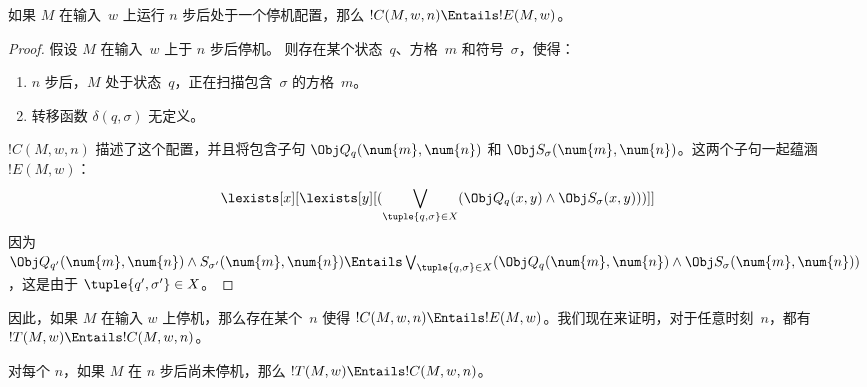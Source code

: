 \documentclass[../../../include/open-logic-section]{subfiles}
\begin{document}
\begin{lem}
如果 $M$ 在输入~$w$ 上运行 $n$ 步后处于一个停机配置，那么 $!C(M, w, n) \Entails !E(M, w)$。
\end{lem}

\begin{proof}
假设 $M$ 在输入~$w$ 上于 $n$ 步后停机。
则存在某个状态~$q$、方格~$m$ 和符号~$\sigma$，使得：
\begin{enumerate}
\item $n$ 步后，$M$ 处于状态~$q$，正在扫描包含~$\sigma$ 的方格~$m$。
\item 转移函数 $\delta(q, \sigma)$ 无定义。
\end{enumerate}
$!C(M, w, n)$ 描述了这个配置，并且将包含子句 $\Obj Q_{q}(\num{m}, \num{n})$ 和 $\Obj
S_{\sigma}(\num{m}, \num{n})$。这两个子句一起蕴涵 $!E(M, w)$：
\[
\lexists[x][\lexists[y][(\bigvee_{\tuple{q, \sigma} \in
      X}(\Obj Q_q(x, y) \land \Obj S_\sigma(x, y)))]]
\]
因为 $\Obj Q_{q'}(\num{m}, \num{n}) \land S_{\sigma'}(\num{m}, \num{n}) \Entails \bigvee_{\tuple{q, \sigma} \in X} (\Obj Q_q(\num{m}, \num{n}) \land \Obj S_{\sigma}(\num{m}, \num{n}))$，这是由于 $\tuple{q',\sigma'} \in X$。
\end{proof}

\begin{explain}
因此，如果 $M$ 在输入 $w$ 上停机，那么存在某个~$n$ 使得 $!C(M,
w, n) \Entails !E(M,w)$。我们现在来证明，对于任意时刻~$n$，都有 $!T(M, w) \Entails !C(M, w, n)$。
\end{explain}

\begin{lem}
对每个 $n$，如果 $M$ 在 $n$ 步后尚未停机，那么 $!T(M, w)
\Entails !C(M, w, n)$。
\end{lem}
\end{document}
